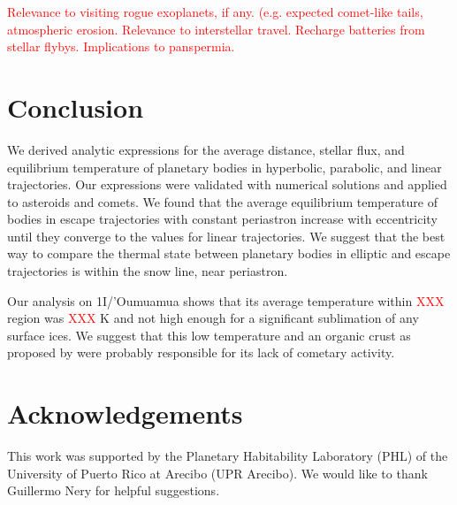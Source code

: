 \documentclass[a4paper,fleqn,usenatbib]{mnras}
\newcommand{\fix}{\textcolor{red}}
\begin{document}
\fix{Relevance to visiting rogue exoplanets, if any. (e.g. expected comet-like tails, atmospheric erosion. Relevance to interstellar travel. Recharge batteries from stellar flybys. Implications to panspermia.}


\section{Conclusion}
\label{sec:conclusion}


We derived analytic expressions for the average distance, stellar flux, and equilibrium temperature of planetary bodies in hyperbolic, parabolic, and linear trajectories. Our expressions were validated with numerical solutions and applied to asteroids and comets. We found that the average equilibrium temperature of bodies in escape trajectories with constant periastron increase with eccentricity until they converge to the values for linear trajectories. We suggest that the best way to compare the thermal state between planetary bodies in elliptic and escape trajectories is within the snow line, near periastron.


Our analysis on 1I/'Oumuamua shows that its average temperature within \fix{XXX} region was \fix{XXX} K and not high enough for a significant sublimation of any surface ices. We suggest that this low temperature and an organic crust as proposed by \citet{2017arXiv171206552F} were probably responsible for its lack of cometary activity.


\section*{Acknowledgements}

This work was supported by the Planetary Habitability Laboratory (PHL) of the University of Puerto Rico at Arecibo (UPR Arecibo). We would like to thank Guillermo Nery for helpful suggestions.



\end{document}
